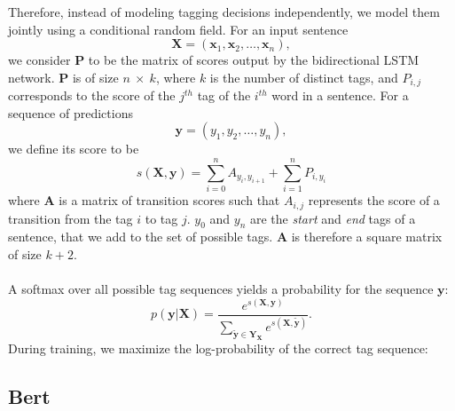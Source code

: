 Therefore, instead of modeling tagging decisions independently, we model them jointly using a conditional random field. For an input sentence
$$\mathbf{X} = (\mathbf{x}_1, \mathbf{x}_2, \ldots, \mathbf{x}_n),$$
we consider $\mathbf{P}$ to be the matrix of scores output by the bidirectional LSTM network. $\mathbf{P}$ is of size $n~\times~k$, where $k$ is the number of distinct tags, and $P_{i, j}$ corresponds to the score of the $j^{th}$ tag of the $i^{th}$ word in a sentence. For a sequence of predictions
$$\mathbf{y} = (y_1, y_2, \ldots, y_n),$$
we define its score to be
$$s(\mathbf{X}, \mathbf{y})=\sum_{i=0}^{n} A_{y_i, y_{i+1}} + \sum_{i=1}^{n} P_{i, y_i}$$
where $\mathbf{A}$ is a matrix of transition scores such that $A_{i, j}$ represents the score of a transition from the tag $i$ to tag $j$. $y_0$ and $y_n$ are the \textit{start} and \textit{end} tags of a sentence, that we add to the set of possible tags. $\mathbf{A}$ is therefore a square matrix of size $k+2$.
\\
\\
A softmax over all possible tag sequences yields a probability for the sequence $\mathbf{y}$:
$$p(\mathbf{y} | \mathbf{X}) = \frac{
	e^{s(\mathbf{X}, \mathbf{y})}
}{
	\sum_{\mathbf{\widetilde{y}} \in \mathbf{Y_X}} e^{s(\mathbf{X}, \mathbf{\widetilde{y}})}
}.$$
During training, we maximize the log-probability of the correct tag sequence:

\subsection{Bert}


